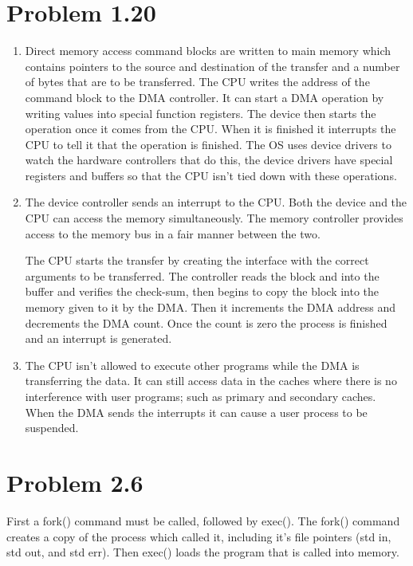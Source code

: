 \documentclass[a4paper,11pt]{article}
\theoremstyle{mytheor}
\begin{document}
\section*{Problem 1.20}
\begin{enumerate}
\item Direct memory access command blocks are written to main memory which contains pointers to the source and destination of the transfer and a number of bytes that are to be transferred. The CPU writes the address of the command block to the DMA controller. It can start a DMA operation by writing values into special function registers. The device then starts the operation once it comes from the CPU. When it is finished it interrupts the CPU to tell it that the operation is finished. The OS uses device drivers to watch the hardware controllers that do this, the device drivers have special registers and buffers so that the CPU isn't tied down with these operations.

\item The device controller sends an interrupt to the CPU. Both the device and the CPU can access the memory simultaneously. The memory controller provides access to the memory bus in a fair manner between the two.  \par 
\setlength\parindent{24pt} The CPU starts the transfer by creating the interface with the correct arguments to be transferred.
The controller reads the block and into the buffer and verifies the check-sum, then begins to copy the block into the memory given to it by the DMA. Then it increments the DMA address and decrements the DMA count. Once the count is zero the process is finished and an interrupt is generated.

\item The CPU isn't allowed to execute other programs while the DMA is transferring the data. It can still access data in the caches where there is no interference with user programs; such as primary and secondary caches. When the DMA sends the interrupts it can cause a user process to be suspended.
\end{enumerate}

\section*{Problem 2.6}
First a fork() command must be called, followed by exec(). The fork() command creates a copy of the process which called it, including it's file pointers (std in, std out, and std err). Then exec() loads the program that is called into memory. 
\end{document}
